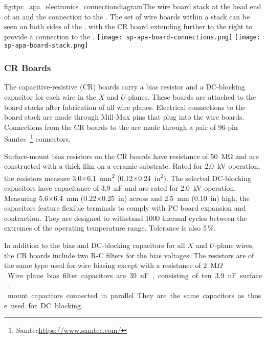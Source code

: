 \begin{dunefigure}{fig:tpc_apa_electronics_connectiondiagram}{The wire board stack at the head end of an  and the connection to the . The set of wire boards within a stack can be seen on both sides of the , with the CR board extending further to the right to provide a connection to the .}
\texttt{[image: sp-apa-board-connections.png]}
\texttt{[image: sp-apa-board-stack.png]}
\end{dunefigure} 


\subsubsection{CR Boards}
\label{sec:crboards}

The capacitive-resistive (CR) boards carry a bias resistor and a DC-blocking capacitor for each wire in the $X$ and $U$-planes. These boards are attached to the board stacks after fabrication of all wire planes.   Electrical connections to the board stack are made through Mill-Max pins that plug into the wire boards. Connections from the CR boards to the  are made through a pair of \num{96}-pin Samtec~\footnote{Samtec\texttrademark \url{https://www.samtec.com/}} connectors.

Surface-mount bias resistors on the CR boards have resistance of \SI{50}{\mega\ohm} and are constructed with a thick film on a ceramic substrate. Rated for \SI{2.0}{kV} operation, the resistors measure \num{3.0}$\times$\SI{6.1}{mm^2} (\num{0.12}$\times$\SI{0.24}{in^2}). The selected DC-blocking capacitors have capacitance of \SI{3.9}{nF} and are rated for \SI{2.0}{kV} operation. Measuring \num{5.6}$\times$\SI{6.4}{mm} (\num{0.22}$\times$\SI{0.25}{in}) across and \SI{2.5}{mm} (\SI{0.10}{in}) high, the capacitors feature flexible terminals to comply with PC board expansion and contraction. They are designed to withstand \num{1000} thermal cycles between the extremes of the operating temperature range. Tolerance is also \num{5}\,\%.

In addition to the bias and DC-blocking capacitors for all $X$ and $U$-plane wires, the CR boards include two R-C filters for the bias voltages. The resistors are of the same type used for wire biasing except with a resistance of \SI{2}{M$\Omega$}. Wire plane bias filter capacitors are \SI{39}{nF}, consisting of ten \SI{3.9}{nF} surface-mount capacitors connected in parallel. They are the same capacitors as those used for DC blocking.

